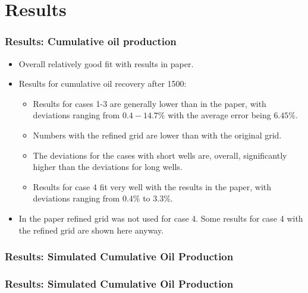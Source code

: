 \section{Results}

\begin{frame}
    \frametitle{Results: Cumulative oil production}
    \begin{itemize}
        \item Overall relatively good fit with results in paper.
        \pause
        \item Results for cumulative oil recovery after 1500:
        \begin{itemize}
             \item Results for cases 1-3 are generally lower than in the paper, with deviations ranging from $0.4-14.7\%$ with the average error being $6.45\%$. 
            \pause
             \item Numbers with the refined grid are lower than with the original grid. 
            \pause
             \item The deviations for the cases with short wells are, overall, significantly higher than the deviations for long wells.
            \pause
             \item Results for case 4 fit very well with the results in the paper, with deviations ranging from $0.4\%$ to $3.3\%$.
         \end{itemize} 
        \pause
        \item In the paper refined grid was not used for case 4. Some results for case 4 with the refined grid are shown here anyway.
    \end{itemize}
\end{frame}


\begin{frame}
    \frametitle{Results: Simulated Cumulative Oil Production}
    \footnotesize
    \centerline{}
\end{frame}


\begin{frame}
    \frametitle{Results: Simulated Cumulative Oil Production}
    \footnotesize
    \centerline{}
\end{frame}


